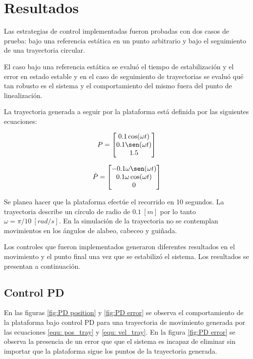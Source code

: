 
\section{Resultados}

Las estrategias de control implementadas fueron probadas con dos casos de prueba: bajo una referencia estática en un punto arbitrario y bajo el seguimiento de una trayectoria circular.

El caso bajo una referencia estática se evaluó el tiempo de estabilización y el error en estado estable y en el caso de seguimiento de trayectorias se evaluó qué tan robusto es el sistema y el comportamiento del mismo fuera del punto de linealización.

La trayectoria generada a seguir por la plataforma está definida por las siguientes ecuaciones:

\begin{equation} \label{equ: pos_tray}
    P = \begin{bmatrix}
    0.1 \cos (\omega t) \\
    0.1 \sen (\omega t) \\
    1.5
    \end{bmatrix}
\end{equation}

\begin{equation}\label{equ: vel_tray}
    \dot{P} = \begin{bmatrix}
    -0.1 \omega \sen (\omega t) \\
    0.1 \omega \cos (\omega t) \\
    0
    \end{bmatrix}
\end{equation}

Se planea hacer que la plataforma efectúe el recorrido en 10 segundos. 
La trayectoria describe un círculo de radio de $0.1 \ [m]$
por lo tanto  $\omega = \pi / 10 \ [rad/s]$. 
En la simulación de la trayectoria no se contemplan movimientos en los ángulos de alabeo, cabeceo y guiñada.

Los controles que fueron implementados generaron diferentes resultados en el movimiento y el punto final una vez que se estabilizó el sistema. 
Los resultados se presentan a continuación.

\subsection{Control PD}
En las figuras \ref{fig:PD position} y \ref{fig:PD error} se observa el comportamiento de la plataforma bajo control PD para una trayectoria de movimiento generada por las ecuaciones \ref{equ: pos_tray} y \ref{equ: vel_tray}. 
En la figura \ref{fig:PD error} se observa la presencia de un error que que el sistema es incapaz de eliminar sin importar que la plataforma sigue los puntos de la trayectoria generada.

